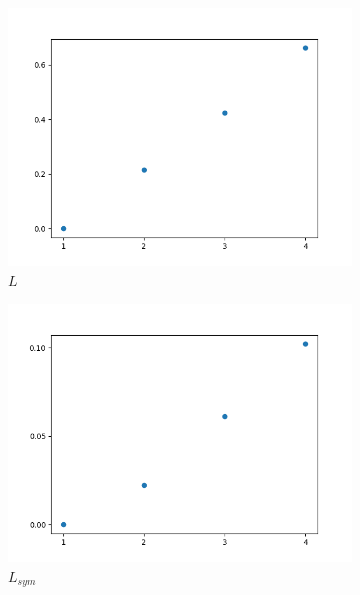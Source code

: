 \documentclass[a4paper,12pt]{article}
\theoremstyle{definition}
\theoremstyle{plain}
\begin{document}
\begin{figure}[H]
	\captionsetup{justification=centering}
	\begin{subfigure}{.3\textwidth}
		\centering
		\includegraphics[width=1.1\linewidth]{figures/Fig_E4_L}
		\caption{$L$}
	\end{subfigure}
	\begin{subfigure}{.3\textwidth}
		\centering
		\includegraphics[width=1.1\linewidth]{figures/Fig_E5_L_sym}
		\caption{$L_{sym}$}
	\end{subfigure}
	\begin{subfigure}{.3\textwidth}
		\centering

\end{subfigure}
\end{figure}
\end{document}

